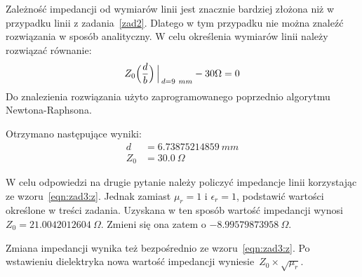 \documentclass[rep.tex]{subfiles}
\begin{document}
Zależność impedancji od wymiarów linii jest znacznie bardziej złożona niż w przypadku linii z zadania~\ref{zad2}.
Dlatego w tym przypadku nie można znaleźć rozwiązania w sposób analityczny.
W celu określenia wymiarów linii należy rozwiązać równanie:
\begin{equation}
  Z_0\Big(\frac{d}{b}\Big)\Big\arrowvert_{d=9~mm} - 30 \Omega = 0
  \label{eqn:zad3:eq}
\end{equation}
Do znalezienia rozwiązania użyto zaprogramowanego poprzednio algorytmu Newtona-Raphsona.

Otrzymano następujące wyniki:
\begin{align}
  d   &= 6.73875214859~mm \\
  Z_0 &= 30.0~\Omega
\end{align}

W celu odpowiedzi na drugie pytanie należy policzyć impedancje linii korzystając ze wzoru~\ref{eqn:zad3:z}.
Jednak zamiast $\mu_r = 1$ i $\epsilon_r = 1$, podstawić wartości określone w treści zadania.
Uzyskana w ten sposób wartość impedancji wynosi $Z_0 = 21.0042012604~\Omega$.
Zmieni się ona zatem o $-8.99579873958~\Omega$.

Zmiana impedancji wynika też bezpośrednio ze wzoru~\ref{eqn:zad3:z}.
Po wstawieniu dielektryka nowa wartość impedancji wyniesie~$Z_0 \times \sqrt{\mu_r}$.
\end{document}
